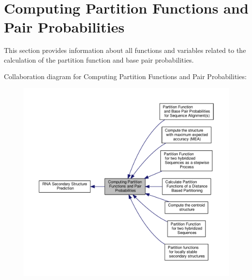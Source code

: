 \hypertarget{group__pf__fold}{\section{Computing Partition Functions and Pair Probabilities}
\label{group__pf__fold}
}


This section provides information about all functions and variables related to the calculation of the partition function and base pair probabilities.  


Collaboration diagram for Computing Partition Functions and Pair Probabilities\-:
\nopagebreak
\begin{figure}[H]
\begin{center}
\leavevmode
\includegraphics[width=350pt]{group__pf__fold}
\end{center}
\end{figure}
